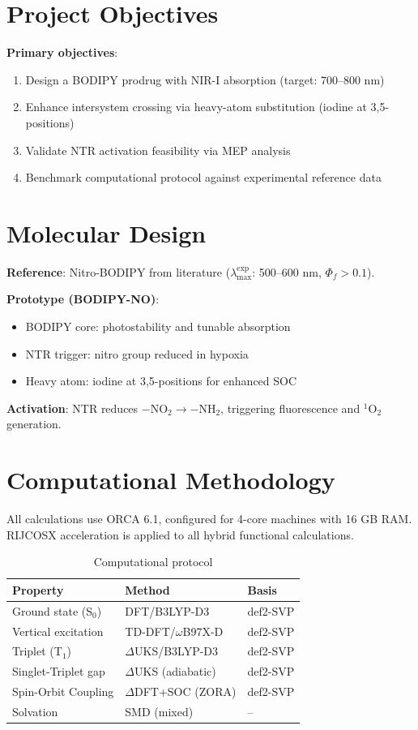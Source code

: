 \documentclass[12pt,a4paper]{article}
\begin{document}
\section{Project Objectives}

\textbf{Primary objectives}:
\begin{enumerate}
  \item Design a BODIPY prodrug with NIR-I absorption (target: 700--800 nm)
  \item Enhance intersystem crossing via heavy-atom substitution (iodine at 3,5-positions)
  \item Validate NTR activation feasibility via MEP analysis
  \item Benchmark computational protocol against experimental reference data
\end{enumerate}

\section{Molecular Design}

\textbf{Reference}: Nitro-BODIPY from literature ($\lambda_{\max}^{\text{exp}}$: 500--600 nm, $\Phi_f > 0.1$).

\textbf{Prototype (BODIPY-NO)}:
\begin{itemize}
  \item BODIPY core: photostability and tunable absorption
  \item NTR trigger: nitro group reduced in hypoxia
  \item Heavy atom: iodine at 3,5-positions for enhanced SOC
\end{itemize}

\textbf{Activation}: NTR reduces $-\text{NO}_2 \rightarrow -\text{NH}_2$, triggering fluorescence and $^1\text{O}_2$ generation.

\section{Computational Methodology}

All calculations use ORCA 6.1, configured for 4-core machines with 16 GB RAM. RIJCOSX acceleration is applied to all hybrid functional calculations.

\begin{table}[h]
\centering
\caption{Computational protocol}
\begin{tabular}{@{}lll@{}}
\toprule
\textbf{Property} & \textbf{Method} & \textbf{Basis} \\
\midrule
Ground state (S$_0$) & DFT/B3LYP-D3 & def2-SVP \\
Vertical excitation & TD-DFT/$\omega$B97X-D & def2-SVP \\
Triplet (T$_1$) & $\Delta$UKS/B3LYP-D3 & def2-SVP \\
Singlet-Triplet gap & $\Delta$UKS (adiabatic) & def2-SVP \\
Spin-Orbit Coupling & $\Delta$DFT+SOC (ZORA) & def2-SVP \\
Solvation & SMD (mixed) & -- \\
\bottomrule
\end{tabular}
\end{table}
\end{document}
